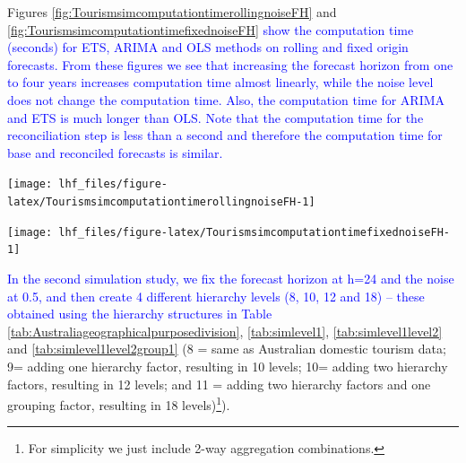 \documentclass[11pt,a4paper,]{article}
\let\origfigure\figure
\let\endorigfigure\endfigure
\renewenvironment{figure}[1][2] {
    \expandafter\origfigure\expandafter[!htbp]
} {
    \endorigfigure
}
\begin{document}
Figures \ref{fig:TourismsimcomputationtimerollingnoiseFH} and \ref{fig:TourismsimcomputationtimefixednoiseFH} \textcolor{blue}{show the computation time (seconds) for ETS, ARIMA and OLS methods on rolling and fixed origin forecasts. From these figures we see that increasing the forecast horizon from one to four years increases computation time almost linearly, while the noise level does not change the computation time. Also, the computation time for ARIMA and ETS is much longer than OLS. Note that the computation time for the reconciliation step is less than a second and therefore the computation time for base and reconciled forecasts is similar.}

\begin{figure}

{\centering \texttt{[image: lhf\_files/figure-latex/TourismsimcomputationtimerollingnoiseFH-1]} 

}

\caption{Computation time (seconds) for ETS, ARIMA and OLS with and without reconciliation - Rolling  origin forecasts on one to four year test set and different error values - 304 bottom level series and 8 levels of hierarchy - Simulated tourism dataset.}\label{fig:TourismsimcomputationtimerollingnoiseFH}
\end{figure}

\begin{figure}

{\centering \texttt{[image: lhf\_files/figure-latex/TourismsimcomputationtimefixednoiseFH-1]} 

}

\caption{Computation time (seconds) for ETS, ARIMA and OLS with and without reconciliation - Fixed origin forecasts on one to four year test set and different error values - 304 bottom level series and 8 levels of hierarchy - Simulated tourism dataset.}\label{fig:TourismsimcomputationtimefixednoiseFH}
\end{figure}

\textcolor{blue}{In the second simulation study, we fix the forecast horizon at h=24 and the noise at 0.5, and then create 4 different hierarchy levels (8, 10, 12 and 18) -- these obtained using the hierarchy structures in Table} \ref{tab:Australiageographicalpurposedivision}, \ref{tab:simlevel1}, \ref{tab:simlevel1level2} and \ref{tab:simlevel1level2group1} (8 = same as Australian domestic tourism data; 9= adding one hierarchy factor, resulting in 10 levels; 10= adding two hierarchy factors, resulting in 12 levels; and 11 = adding two hierarchy factors and one grouping factor, resulting in 18 levels)\footnote{For simplicity we just include 2-way aggregation combinations.}).
\end{document}
